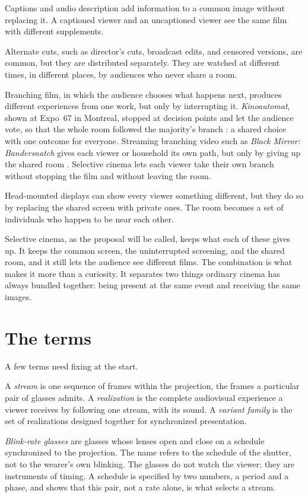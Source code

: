 Captions and audio description add information to a common image without replacing it. A captioned viewer and an uncaptioned viewer see the same film with different supplements.

Alternate cuts, such as director's cuts, broadcast edits, and censored versions, are common, but they are distributed separately. They are watched at different times, in different places, by audiences who never share a room.

Branching film, in which the audience chooses what happens next, produces different experiences from one work, but only by interrupting it. \emph{Kinoautomat}, shown at Expo~67 in Montreal, stopped at decision points and let the audience vote, so that the whole room followed the majority's branch \cite{kinoautomat}: a shared choice with one outcome for everyone. Streaming branching video such as \emph{Black Mirror: Bandersnatch} gives each viewer or household its own path, but only by giving up the shared room \cite{bandersnatch}. Selective cinema lets each viewer take their own branch without stopping the film and without leaving the room.

Head-mounted displays can show every viewer something different, but they do so by replacing the shared screen with private ones. The room becomes a set of individuals who happen to be near each other.

Selective cinema, as the proposal will be called, keeps what each of these gives up. It keeps the common screen, the uninterrupted screening, and the shared room, and it still lets the audience see different films. The combination is what makes it more than a curiosity. It separates two things ordinary cinema has always bundled together: being present at the same event and receiving the same images.

\section*{The terms}

A few terms need fixing at the start.

A \emph{stream} is one sequence of frames within the projection, the frames a particular pair of glasses admits. A \emph{realization} is the complete audiovisual experience a viewer receives by following one stream, with its sound. A \emph{variant family} is the set of realizations designed together for synchronized presentation.

\emph{Blink-rate glasses} are glasses whose lenses open and close on a schedule synchronized to the projection. The name refers to the schedule of the shutter, not to the wearer's own blinking. The glasses do not watch the viewer; they are instruments of timing. A schedule is specified by two numbers, a period and a phase, and  shows that this pair, not a rate alone, is what selects a stream.

